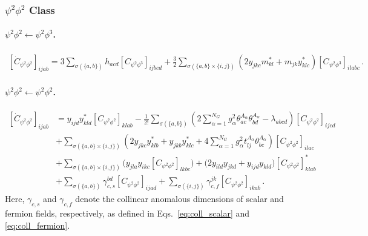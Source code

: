 \subsubsection{\texorpdfstring{$\psi^2 \phi^2$}{psi2phi2} Class}

\paragraph{\texorpdfstring{$\psi^2 \phi^2 \leftarrow \psi^2 \phi^3$}{psi2phi2frompsi2phi3}.}

\begin{align}
    \left[\dot C_{\psi^2\phi^2}\right]_{ijab} = 3\sum_{\sigma(\{a,b\})} h_{acd}\left[ C_{\psi^2\phi^3}\right]_{ijbcd} 
+ \frac{3}{2}\sum_{\sigma(\{a,b\}\times \{i,j\})}\left(2 y_{jkc}m^*_{kl}+m_{jk}y^*_{klc}\right)\left[ C_{\psi^2\phi^3}\right]_{ilabc}\,.\label{psi2phi2_psi2phi3}
\end{align}

\paragraph{\texorpdfstring{$\psi^2 \phi^2 \leftarrow \psi^2 \phi^2$}{psi2phi2frompsi2phi2}.}

\begin{align}
    \left[\dot C_{\psi^2\phi^2}\right]_{ijab} &= 
    y_{ijd}y_{kld}^* \left[ C_{\psi^2\phi^2}\right]_{klab}
    - \frac{1}{2!}\sum_{\sigma(\{a,b\})} \left(2\sum_{\alpha=1}^{N_G} g_\alpha^2 \theta^{A_\alpha}_{ac}\theta^{A_\alpha}_{bd}-\lambda_{abcd}\right)\left[ C_{\psi^2\phi^2}\right]_{ijcd} \nonumber 
\\
    & + \sum_{\sigma(\{a,b\}\times \{i,j\})}\left(2 y_{jkc}y^*_{klb}+y_{jkb}y^*_{klc} + 4 \sum_{\alpha=1}^{N_G} g_\alpha^2 t^{A_\alpha}_{lj} \theta^{A_\alpha}_{bc}\right)\left[ C_{\psi^2\phi^2}\right]_{ilac} \nonumber \\
    &+\sum_{\sigma(\{a,b\}\times \{i,j\})}\Bigg( y_{jla} y_{ikc} \left[C_{\psi^2\phi^2}\right]_{lkbc} \Bigg) +\Bigg(2y_{ild}y_{jkd}+y_{ijd}y_{kld}\Bigg)\left[C_{\psi^2\phi^2}\right]_{klab}^* \nonumber\\
    & + \sum_{\sigma(\{a,b\})} \gamma_{c,s}^{bd} \left[ C_{\psi^2\phi^2}\right]_{ijad} + \sum_{\sigma(\{i,j\})}\gamma_{c,f}^{jk} \left[ C_{\psi^2\phi^2}\right]_{ikab} \,.\label{psi2phi3_psi2phi2}
\end{align}
Here, $\gamma_{c,s}$ and $\gamma_{c,f}$ denote the collinear anomalous dimensions of scalar and fermion fields, respectively, as defined in Eqs.~\eqref{eq:coll_scalar} and \eqref{eq:coll_fermion}.

